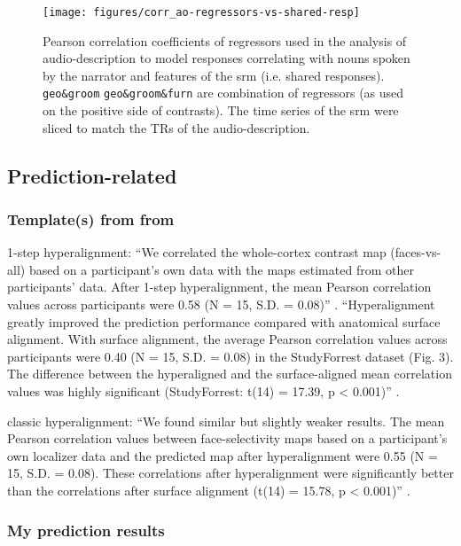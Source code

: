 \begin{figure*}[tbp]
\centering
    \texttt{[image: figures/corr\_ao-regressors-vs-shared-resp]}
    \caption{Pearson correlation coefficients of regressors used in the analysis
    of audio-description to model responses correlating with nouns spoken by the
    narrator and features of the \ac{srm} (i.e. shared responses).
    \texttt{geo\&groom} \texttt{geo\&groom\&furn} are combination of regressors
    (as used on the positive side of contrasts). The
    time series of the \ac{srm} were sliced to match the TRs of the
    audio-description.
      }
\label{fig:reg-corr}
\end{figure*}


\subsection{Prediction-related}

\subsubsection{Template(s) from from \citet{jiahui2020predicting}}

1-step hyperalignment: ``We correlated the whole-cortex contrast map
(faces-vs-all) based on a participant's own data with the maps estimated from
other participants' data.  After 1-step hyperalignment, the mean Pearson
correlation values across participants were 0.58 (N = 15, S.D. = 0.08)''
\citep{jiahui2020predicting}.
%
``Hyperalignment greatly improved the prediction performance compared with
anatomical surface alignment. With surface alignment, the average Pearson
correlation values across participants were 0.40 (N = 15, S.D. = 0.08) in the
StudyForrest dataset (Fig. 3). The difference between the hyperaligned and the
surface-aligned mean correlation values was highly significant (StudyForrest:
t(14) = 17.39, p < 0.001)'' \citep{jiahui2020predicting}.

%
classic hyperalignment: ``We found similar but slightly weaker results. The mean
Pearson correlation values between face-selectivity maps based on a
participant's own localizer data and the predicted map after hyperalignment were
0.55 (N = 15, S.D. = 0.08). These correlations after hyperalignment were
significantly better than the correlations after surface alignment (t(14) =
15.78, p < 0.001)'' \citep{jiahui2020predicting}.


\subsubsection{My prediction results}

